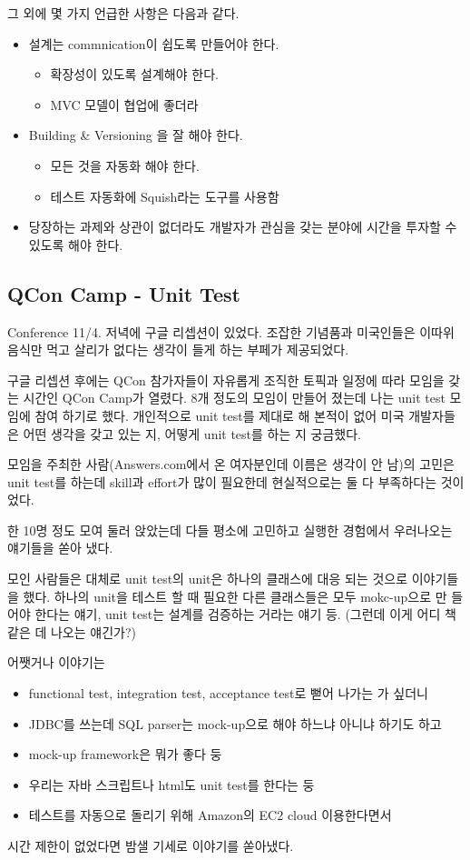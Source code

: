 \documentclass[11pt]{article}
\begin{document}
그 외에 몇 가지 언급한 사항은 다음과 같다.
\begin{itemize}
\item 설계는 commnication이 쉽도록 만들어야 한다.
    \begin{itemize}
    \item 확장성이 있도록 설계해야 한다.
    \item MVC 모델이 협업에 좋더라
    \end{itemize}
\item Building \& Versioning 을 잘 해야 한다.
    \begin{itemize}
    \item 모든 것을 자동화 해야 한다.
    \item 테스트 자동화에 Squish라는 도구를 사용함
    \end{itemize}
\item 당장하는 과제와 상관이 없더라도 개발자가 관심을 갖는 분야에 시간을 투자할 수 있도록 해야 한다.
\end{itemize}
 
\subsection{QCon Camp - Unit Test}

Conference 11/4. 저녁에 구글 리셉션이 있었다. 조잡한 기념품과 미국인들은
이따위 음식만 먹고 살리가 없다는 생각이 들게 하는 부페가 제공되었다.
 
구글 리셉션 후에는 QCon 참가자들이 자유롭게 조직한 토픽과 일정에 따라
모임을 갖는 시간인 QCon Camp가 열렸다. 8개 정도의 모임이 만들어 졌는데
나는 unit test 모임에 참여 하기로 했다.
개인적으로 unit test를 제대로 해 본적이 없어 미국 개발자들은 어떤
생각을 갖고 있는 지, 어떻게 unit test를 하는 지 궁금했다.

모임을 주최한 사람(Answers.com에서 온 여자분인데 이름은 생각이 안 남)의 
고민은 unit test를 하는데 skill과 effort가 많이 필요한데 현실적으로는
둘 다 부족하다는 것이었다. 

한 10명 정도 모여 둘러 앉았는데 다들 평소에 고민하고 실행한 경험에서
우러나오는 얘기들을 쏟아 냈다.
 
모인 사람들은 대체로 unit test의 unit은 하나의
클래스에 대응 되는 것으로 이야기들을 했다. 하나의 unit을 테스트 할 때
필요한 다른 클래스들은 모두 mokc-up으로 만 들어야 한다는 얘기, unit
test는 설계를 검증하는 거라는 얘기 등. 
(그런데 이게 어디 책같은 데 나오는 얘긴가?)
 
어쨋거나 이야기는 
\begin{itemize}
\item functional test, integration test, acceptance test로 뻗어 나가는 
가 싶더니 
\item JDBC를 쓰는데 SQL parser는  mock-up으로 해야 하느냐 아니냐 하기도 하고 
\item mock-up framework은 뭐가 좋다 둥 
\item 우리는 자바 스크립트나 html도 unit test를 한다는 둥
\item 테스트를 자동으로 돌리기 위해 Amazon의 EC2 cloud 이용한다면서 
\end{itemize}
시간 제한이 없었다면 밤샐 기세로 이야기를 쏟아냈다. 
\end{document}
